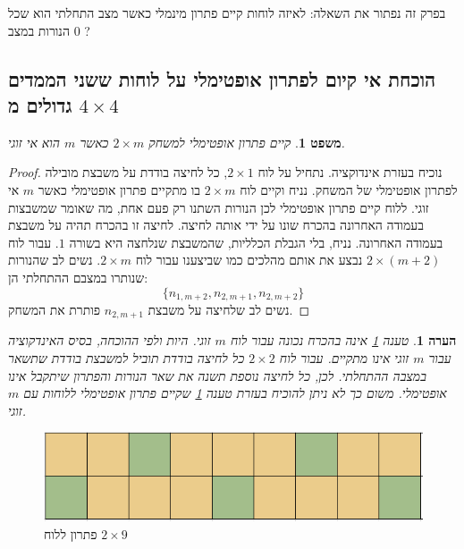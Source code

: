 \documentclass[12pt,leqno]{article}
\theoremstyle{theoremdd}
\newtheorem{theorem}{משפט}[section]
\newtheorem{comm}{הערה}[section]
\begin{document}
בפרק זה נפתור את השאלה: לאיזה לוחות קיים פתרון מינמלי
כאשר מצב התחלתי הוא שכל הנורות במצב
$0$
?

\subsection{הוכחת אי קיום לפתרון אופטימלי על לוחות ששני הממדים גדולים מ
\texorpdfstring{$4 \times 4$}{4 x 4}}
\begin{theorem}
    \label{comm:sol to 2 x m}
    קיים פתרון אופטימלי למשחק 
    $2 \times m$
    כאשר 
    $m$
    הוא אי זוגי.
\end{theorem}
\begin{proof}
    נוכיח בעזרת אינדוקציה.
    נתחיל על לוח 
    $2 \times 1$,
    כל לחיצה בודדת על משבצת מובילה לפתרון אופטימלי של המשחק.
    נניח וקיים לוח 
    $2 \times m$
    בו מתקיים פתרון אופטימלי
    כאשר 
    $m$
    אי זוגי.
    ללוח קיים פתרון אופטימלי 
    לכן הנורות השתנו רק פעם אחת,
    מה שאומר שמשבצות בעמודה האחרונה 
    בהכרח שונו על ידי אותה לחיצה.
    לחיצה זו בהכרח תהיה על משבצת בעמודה האחרונה.
    נניח, בלי הגבלת הכלליות, שהמשבצת שנלחצה היא בשורה 
    $1$.
    עבור לוח 
    $2 \times (m+2)$
    נבצע את אותם מהלכים כמו שביצענו עבור לוח 
    $2 \times m$.
    נשים לב 
    שהנורות שנותרו במצבם ההתחלתי הן:
    \[ \{n_{1,m+2}, n_{2,m+1}, n_{2,m+2}\} \]
    נשים לב שלחיצה על 
    משבצת 
    $n_{2,m+1}$
    פותרת את המשחק.
\end{proof}
\begin{comm}
    טענה 
    \ref{comm:sol to 2 x m}
    אינה בהכרח נכונה עבור לוח 
    $m$
    זוגי.
    היות ולפי ההוכחה, בסיס האינדקוציה עבור 
    $m$
    זוגי אינו מתקיים.
    עבור לוח 
    $2 \times 2$
    כל לחיצה בודדת תוביל למשבצת בודדת שתשאר במצבה ההתחלתי.
    לכן, כל לחיצה נוספת תשנה את שאר הנורות והפתרון שיתקבל אינו אופטימלי.
    משום כך לא ניתן להוכיח בעזרת טענה 
    \ref{comm:sol to 2 x m}
    שקיים פתרון אופטימלי ללוחות עם 
    $m$
    זוגי.
\end{comm}

\begin{figure}[ht]
    \caption{פתרון ללוח 
    $2 \times 9$}
    \label{fig: 2x9 have min sol}
    \centering
    \includegraphics[width=.5\textwidth,keepaspectratio]{images/2xm_sol.PNG}
\end{figure}
\end{document}
